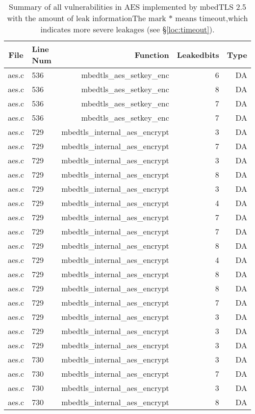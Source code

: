 \begin{table*}%
\centering
\caption{Summary of all vulnerabilities in AES implemented by mbedTLS 2.5 with the amount of leak informationThe mark $*$ means timeout,which indicates more severe leakages (see \S\ref{loc:timeout}).}\label{tab:AESmbedTLS}
\begin{tabular}{clrrr}
\hline
\textbf{File} & \textbf{Line Num} & \textbf{Function} & \textbf{Leakedbits} & \textbf{Type} \\\hline
aes.c&536&mbedtls\_aes\_setkey\_enc&6 &DA\\
aes.c&536&mbedtls\_aes\_setkey\_enc&8 &DA\\
aes.c&536&mbedtls\_aes\_setkey\_enc&7 &DA\\
aes.c&536&mbedtls\_aes\_setkey\_enc&7 &DA\\
aes.c&729&mbedtls\_internal\_aes\_encrypt&3 &DA\\
aes.c&729&mbedtls\_internal\_aes\_encrypt&7 &DA\\
aes.c&729&mbedtls\_internal\_aes\_encrypt&3 &DA\\
aes.c&729&mbedtls\_internal\_aes\_encrypt&8 &DA\\
aes.c&729&mbedtls\_internal\_aes\_encrypt&3 &DA\\
aes.c&729&mbedtls\_internal\_aes\_encrypt&4 &DA\\
aes.c&729&mbedtls\_internal\_aes\_encrypt&7 &DA\\
aes.c&729&mbedtls\_internal\_aes\_encrypt&7 &DA\\
aes.c&729&mbedtls\_internal\_aes\_encrypt&8 &DA\\
aes.c&729&mbedtls\_internal\_aes\_encrypt&4 &DA\\
aes.c&729&mbedtls\_internal\_aes\_encrypt&8 &DA\\
aes.c&729&mbedtls\_internal\_aes\_encrypt&8 &DA\\
aes.c&729&mbedtls\_internal\_aes\_encrypt&7 &DA\\
aes.c&729&mbedtls\_internal\_aes\_encrypt&3 &DA\\
aes.c&729&mbedtls\_internal\_aes\_encrypt&3 &DA\\
aes.c&729&mbedtls\_internal\_aes\_encrypt&3 &DA\\
aes.c&730&mbedtls\_internal\_aes\_encrypt&3 &DA\\
aes.c&730&mbedtls\_internal\_aes\_encrypt&7 &DA\\
aes.c&730&mbedtls\_internal\_aes\_encrypt&3 &DA\\
aes.c&730&mbedtls\_internal\_aes\_encrypt&8 &DA\\

\end{tabular}
\end{table*}
